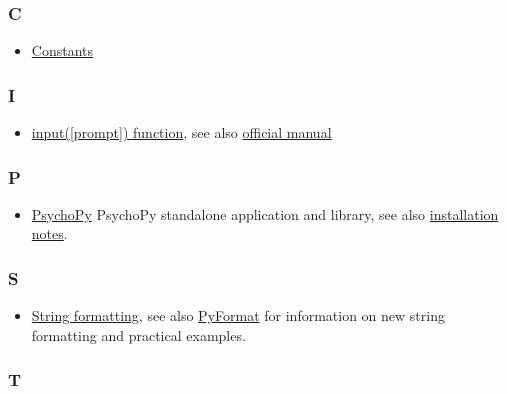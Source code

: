 \documentclass[
]{book}
\providecommand{\tightlist}{%
  \setlength{\itemsep}{0pt}\setlength{\parskip}{0pt}}
\begin{document}
\hypertarget{c}{%
\subsubsection*{C}\label{c}}

\begin{itemize}
\tightlist
\item
  \protect\hyperlink{constants}{Constants}
\end{itemize}

\hypertarget{i}{%
\subsubsection*{I}\label{i}}

\begin{itemize}
\tightlist
\item
  \protect\hyperlink{input-function}{input({[}prompt{]}) function}, see also \href{https://docs.python.org/3/library/functions.html\#input}{official manual}
\end{itemize}

\hypertarget{p}{%
\subsubsection*{P}\label{p}}

\begin{itemize}
\tightlist
\item
  \href{https://www.psychopy.org/}{PsychoPy} PsychoPy standalone application and library, see also \protect\hyperlink{install-psychopy}{installation notes}.
\end{itemize}

\hypertarget{s}{%
\subsubsection*{S}\label{s}}

\begin{itemize}
\tightlist
\item
  \protect\hyperlink{string-formatting}{String formatting}, see also \href{https://pyformat.info/}{PyFormat} for information on new string formatting and practical examples.
\end{itemize}

\hypertarget{t}{%
\subsubsection*{T}\label{t}}
\end{document}
